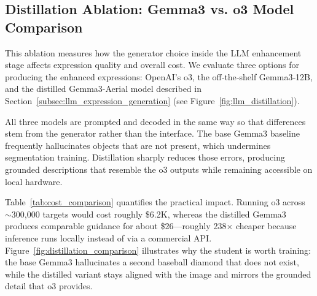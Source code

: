 \subsection{Distillation Ablation: Gemma3 vs. o3 Model Comparison}
\label{subsec:distillation_ablation}

This ablation measures how the generator choice inside the LLM enhancement stage affects expression quality and overall cost. We evaluate three options for producing the enhanced expressions: OpenAI’s o3, the off‑the‑shelf Gemma3‑12B, and the distilled Gemma3-Aerial model described in Section~\ref{subsec:llm_expression_generation} (see Figure~\ref{fig:llm_distillation}).

All three models are prompted and decoded in the same way so that differences stem from the generator rather than the interface. The base Gemma3 baseline frequently hallucinates objects that are not present, which undermines segmentation training. Distillation sharply reduces those errors, producing grounded descriptions that resemble the o3 outputs while remaining accessible on local hardware.

Table~\ref{tab:cost_comparison} quantifies the practical impact. Running o3 across \(\sim\)300{,}000 targets would cost roughly \$6.2K, whereas the distilled Gemma3 produces comparable guidance for about \$26—roughly 238× cheaper because inference runs locally instead of via a commercial API. Figure~\ref{fig:distillation_comparison} illustrates why the student is worth training: the base Gemma3 hallucinates a second baseball diamond that does not exist, while the distilled variant stays aligned with the image and mirrors the grounded detail that o3 provides.

\begin{table}[t]
\centering
\caption{Cost Analysis: Gemma3 vs. o3 Model for Large-Scale Annotation\protect\footnotemark}
\label{tab:cost_comparison}
\end{table}

